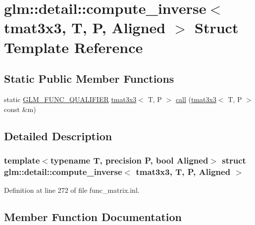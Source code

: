 \hypertarget{structglm_1_1detail_1_1compute__inverse_3_01tmat3x3_00_01_t_00_01_p_00_01_aligned_01_4}{}\section{glm\+::detail\+::compute\+\_\+inverse$<$ tmat3x3, T, P, Aligned $>$ Struct Template Reference}
\label{structglm_1_1detail_1_1compute__inverse_3_01tmat3x3_00_01_t_00_01_p_00_01_aligned_01_4}
\subsection*{Static Public Member Functions}
\begin{DoxyCompactItemize}
\item 
static \mbox{\hyperlink{setup_8hpp_a33fdea6f91c5f834105f7415e2a64407}{G\+L\+M\+\_\+\+F\+U\+N\+C\+\_\+\+Q\+U\+A\+L\+I\+F\+I\+ER}} \mbox{\hyperlink{structglm_1_1tmat3x3}{tmat3x3}}$<$ T, P $>$ \mbox{\hyperlink{structglm_1_1detail_1_1compute__inverse_3_01tmat3x3_00_01_t_00_01_p_00_01_aligned_01_4_a8c096eccf2c888b134275d23bce097ae}{call}} (\mbox{\hyperlink{structglm_1_1tmat3x3}{tmat3x3}}$<$ T, P $>$ const \&m)
\end{DoxyCompactItemize}


\subsection{Detailed Description}
\subsubsection*{template$<$typename T, precision P, bool Aligned$>$\newline
struct glm\+::detail\+::compute\+\_\+inverse$<$ tmat3x3, T, P, Aligned $>$}



Definition at line 272 of file func\+\_\+matrix.\+inl.



\subsection{Member Function Documentation}
\mbox{\label{structglm_1_1detail_1_1compute__inverse_3_01tmat3x3_00_01_t_00_01_p_00_01_aligned_01_4_a8c096eccf2c888b134275d23bce097ae}} 
